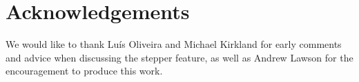 \documentclass[sigconf]{acmart}
\begin{document}
\section{Acknowledgements}

We would like to thank Luís Oliveira and Michael Kirkland for early
comments and advice when discussing the stepper feature, as well as
Andrew Lawson for the encouragement to produce this work.




\end{document}
